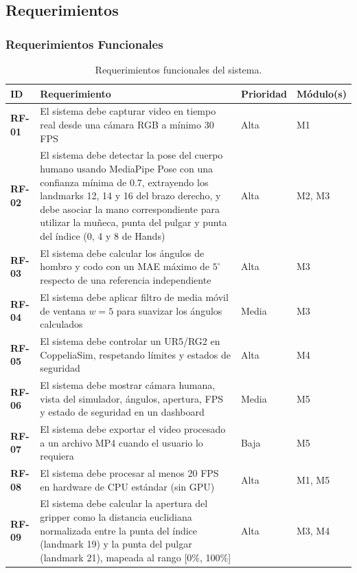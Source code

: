 \subsection{Requerimientos}

\subsubsection*{Requerimientos Funcionales}

\begin{table}[h!]
\centering
\label{tab:req_func}
\renewcommand{\arraystretch}{1.3}
\begin{tabularx}{\textwidth}{
    >{\bfseries}p{1.1cm}
    X
    p{1.6cm}
    p{2.2cm}
}
\toprule
\textbf{ID} &
\textbf{Requerimiento} &
\textbf{Prioridad} &
\textbf{Módulo(s)} \\
\midrule
RF-01 &
  El sistema debe capturar video en tiempo real desde una cámara RGB a
  mínimo 30 FPS &
  Alta & M1 \\
\midrule
RF-02 &
  El sistema debe detectar la pose del cuerpo humano usando MediaPipe
  Pose con una confianza mínima de 0.7, extrayendo los landmarks 12, 14 y 16
  del brazo derecho, y debe asociar la mano correspondiente para utilizar la
  muñeca, punta del pulgar y punta del índice (0, 4 y 8 de Hands) &
  Alta & M2, M3 \\
\midrule
RF-03 &
  El sistema debe calcular los ángulos de hombro y codo con un
  MAE máximo de $5^\circ$ respecto de una referencia independiente &
  Alta & M3 \\
\midrule
RF-04 &
  El sistema debe aplicar filtro de media móvil de ventana $w = 5$
  para suavizar los ángulos calculados &
  Media & M3 \\
\midrule
RF-05 &
  El sistema debe controlar un UR5/RG2 en CoppeliaSim, respetando límites y
  estados de seguridad &
  Alta & M4 \\
\midrule
RF-06 &
  El sistema debe mostrar cámara humana, vista del simulador, ángulos, apertura,
  FPS y estado de seguridad en un dashboard &
  Media & M5 \\
\midrule
RF-07 &
  El sistema debe exportar el video procesado a un archivo MP4 cuando
  el usuario lo requiera &
  Baja & M5 \\
\midrule
RF-08 &
  El sistema debe procesar al menos 20 FPS en hardware de CPU estándar
  (sin GPU) &
  Alta & M1, M5 \\
\midrule
RF-09 &
El sistema debe calcular la apertura del gripper como la distancia euclidiana normalizada entre la punta del índice (landmark 19) y la punta del pulgar (landmark 21), mapeada al rango [0\%, 100\%] &
Alta & M3, M4 \\
\bottomrule
\end{tabularx}
\caption{Requerimientos funcionales del sistema.}
\end{table}

